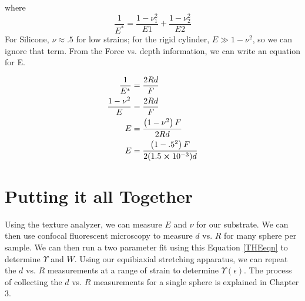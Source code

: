 where 
\begin{equation*}
\frac{1}{E^*} = \frac{1-\nu_1^2}{E1} + \frac{1-\nu_2^2}{E2}
\end{equation*}
For Silicone, $ \nu \approx .5$ for low strains; for the rigid cylinder, $ E \gg 1-\nu^2 $, so we can ignore that term. From the Force vs. depth information, we can write an equation for E.

\begin{align}
\frac{1}{E^*} &= \frac{2Rd}{F} \\
\frac{1 -\nu^2}{E} &= \frac{2Rd}{F} \\
E &= \frac{\left( 1-\nu^2 \right) F}{2Rd} \\
E &= \frac{\left( 1-.5^2 \right) F}{2(1.5 \cross 10^{-3})d}
\end{align}


\section{Putting it all Together}
Using the texture analyzer, we can measure $ E $ and $ \nu $ for our substrate. We can then use confocal fluorescent microscopy to measure $ d $ vs. $ R $ for many sphere per sample. We can then run a two parameter fit using this Equation \ref{THEeqn} to determine $ \Upsilon $ and $ W $. Using our equibiaxial stretching apparatus, we can repeat the $ d $ vs. $ R $ measurements at a range of strain to determine $ \Upsilon(\epsilon) $. The process of collecting the $ d $ vs. $ R $ measurements for a single sphere is explained in Chapter 3.

%